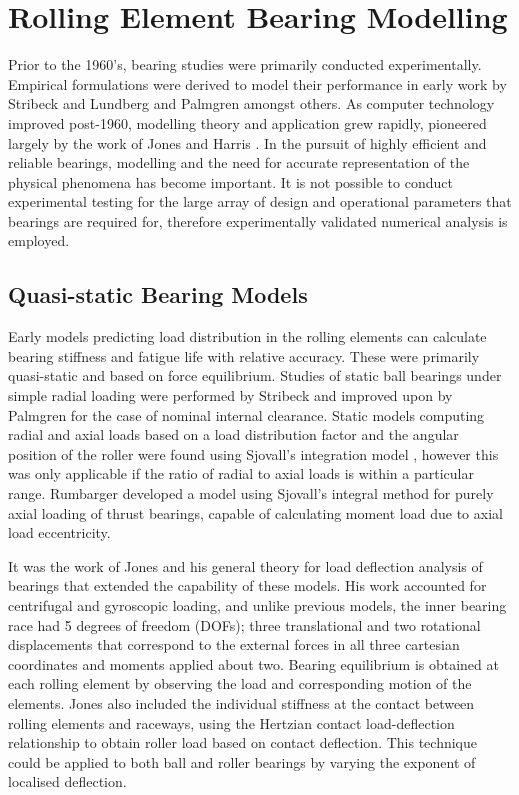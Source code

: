 \section{Rolling Element Bearing Modelling}

Prior to the 1960’s, bearing studies were primarily conducted experimentally. Empirical formulations were derived to model their performance in early work by Stribeck \cite{Stribeck1907} and Lundberg and Palmgren \cite{Lundberg1952} \cite{Palmgren1959} amongst others. As computer technology improved post-1960, modelling theory and application grew rapidly, pioneered largely by the work of Jones \cite{Jones1960} and Harris \cite{Harris1984}. In the pursuit of highly efficient and reliable bearings, modelling and the need for accurate representation of the physical phenomena has become important. It is not possible to conduct experimental testing for the large array of design and operational parameters that bearings are required for, therefore experimentally validated numerical analysis is employed.

\subsection{Quasi-static Bearing Models}

Early models predicting load distribution in the rolling elements can calculate bearing stiffness and fatigue life with relative accuracy. These were primarily quasi-static and based on force equilibrium. Studies of static ball bearings under simple radial loading were performed by Stribeck \cite{Stribeck1907} and improved upon by Palmgren \cite{Palmgren1959} for the case of nominal internal clearance. Static models computing radial and axial loads based on a load distribution factor and the angular position of the roller were found using Sjovall’s integration model \cite{Sjovall1933}, however this was only applicable if the ratio of radial to axial loads is within a particular range. Rumbarger \cite{JRumbarger1962} developed a model using Sjovall’s integral method for purely axial loading of thrust bearings, capable of calculating moment load due to axial load eccentricity. 

It was the work of Jones \cite{Jones1960} and his general theory for load deflection analysis of bearings that extended the capability of these models. His work accounted for centrifugal and gyroscopic loading, and unlike previous models, the inner bearing race had 5 degrees of freedom (DOFs); three translational and two rotational displacements that correspond to the external forces in all three cartesian coordinates and moments applied about two. Bearing equilibrium is obtained at each rolling element by observing the load and corresponding motion of the elements. Jones also included the individual stiffness at the contact between rolling elements and raceways, using the Hertzian contact load-deflection relationship to obtain roller load based on contact deflection. This technique could be applied to both ball and roller bearings by varying the exponent of localised deflection. 

